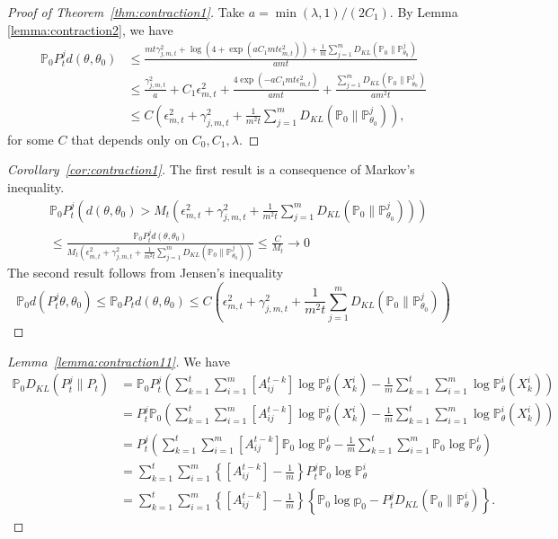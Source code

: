 \documentclass[twoside,11pt]{article}
\numberwithin{equation}{section}
\newcommand\bP{\mathbb{P}}
\newcommand\bp{\mathbb{p}}
\begin{document}
{\begin{proof}[Proof of Theorem~\ref{thm:contraction1}]
Take $a = \min(\lambda, 1)/(2 C_1)$. By Lemma \ref{lemma:contraction2}, we have
\begin{align*}
    \bP_0  P_t^j d(\theta, \theta_0)  &\leq \frac{mt \gamma_{j,m,t}^2 + \log(4 + \exp(a C_1 mt \epsilon_{m,t}^2)) +  \frac{1}{m}\sum_{j = 1}^m D_{KL}(\bP_0 \parallel \bP_{\theta_0}^j)}{a mt}  \\
    &\leq \frac{\gamma_{j,m,t}^2}{a} + C_1 \epsilon_{m,t}^2 + \frac{4 \exp(-a C_1 mt \epsilon_{m,t}^2)}{amt} + \frac{ \sum_{j = 1}^m D_{KL}(\bP_0 \parallel \bP_{\theta_0}^j)}{a m^2 t}\\
    &\leq C \left(\epsilon_{m,t}^2 + \gamma_{j,m,t}^2 + \frac{1}{m^2 t} \sum_{j = 1}^m D_{KL}(\bP_0 \parallel \bP_{\theta_0}^j) \right) , 
\end{align*}
for some $C$ that depends only on $C_0, C_1, \lambda$. 
\end{proof}
\begin{proof}[Corollary~\ref{cor:contraction1}]
The first result is a consequence of Markov's inequality. 
\begin{align*}
  &\bP_0 P_t^j \left( d(\theta, \theta_0) > M_t (\epsilon_{m,t}^2 + \gamma_{j,m,t}^2 + \frac{1}{m^2 t} \sum_{j = 1}^m D_{KL}(\bP_0 \parallel \bP_{\theta_0}^j)) \right) \\
  &\leq \frac{\bP_0 P_t^j  d(\theta, \theta_0)}{M_t (\epsilon_{m,t}^2 + \gamma_{j,m,t}^2 +  \frac{1}{m^2 t} \sum_{j = 1}^m D_{KL}(\bP_0 \parallel \bP_{\theta_0}^j))} \leq \frac{C}{M_t}  \to 0
\end{align*}
The second result follows from Jensen's inequality
\begin{equation*}
    \bP_0 d(P_t^j \theta, \theta_0) \leq \bP_0 P_t d(\theta, \theta_0) \leq C(\epsilon_{m,t}^2 + \gamma_{j,m,t}^2 +  \frac{1}{m^2 t} \sum_{j = 1}^m D_{KL}(\bP_0 \parallel \bP_{\theta_0}^j))
\end{equation*}
\end{proof}
\begin{proof}[Lemma~\ref{lemma:contraction11}]
We have
    \begin{align*}
\bP_0 D_{KL}(P_t^j \parallel P_t) &=  \bP_0 P_t^j \left( \sum_{k = 1}^t \sum_{i = 1}^m [A^{t - k}_{ij}] \log \bP_\theta^i (X_k^i) -  \frac{1}{m}\sum_{k = 1}^t \sum_{i = 1}^m  \log \bP_\theta^i (X_k^i) \right) \\
     &=P_t^j \bP_0 \left( \sum_{k = 1}^t \sum_{i = 1}^m [A^{t - k}_{ij}] \log \bP_\theta^i (X_k^i) -  \frac{1}{m}\sum_{k = 1}^t \sum_{i = 1}^m  \log \bP_\theta^i (X_k^i) \right) \\
     &= P_t^j  \left( \sum_{k = 1}^t \sum_{i = 1}^m [A^{t - k}_{ij}] \bP_0 \log \bP_\theta^i -  \frac{1}{m}\sum_{k = 1}^t \sum_{i = 1}^m  \bP_0 \log \bP_\theta^i \right) \\
     &= \sum_{k = 1}^t \sum_{i = 1}^m 
 \left\{  [A^{t - k}_{ij}] -  \frac{1}{m} \right\} P_t^j  \bP_0 \log \bP_\theta^i \\
 &= \sum_{k = 1}^t \sum_{i = 1}^m 
 \left\{  [A^{t - k}_{ij}] -  \frac{1}{m} \right\} \left\{\bP_0\log \bp_0  - P_t^j D_{KL}(\bP_0 \parallel \bP_\theta^i)\right\}.
 \end{align*}



\end{proof}}
\end{document}
